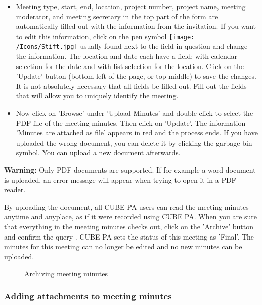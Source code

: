 \begin{itemize}
\item
Meeting type, start, end, location, project number, project name, meeting moderator, and meeting secretary in the top part of the form are automatically filled out with the information from the invitation. If you want to edit this information, click on the pen symbol \texttt{[image: /Icons/Stift.jpg]}  usually found next to the field in question and change the information. The location and date  each have a field: with calendar selection for the date and with list selection for the location. Click on the 'Update' button  (bottom left of the page, or top middle) to save the changes. It is not absolutely necessary that all fields be filled out. Fill out the fields that will allow you to uniquely identify the meeting.
\item
Now click on 'Browse'  under 'Upload Minutes' and double-click to select the PDF file of the meeting minutes. Then click on 'Update'. The information 'Minutes are attached as file' appears in red  and the process ends. If you have uploaded the wrong document, you can delete it by clicking the garbage bin symbol. You can upload a new document afterwards.
\end{itemize}

\vspace{\baselineskip}

\textbf{Warning:} Only PDF documents are supported. If for example a word document is uploaded, an error message will appear when trying to open it in a PDF reader.

\vspace{\baselineskip}

By uploading the document, all CUBE PA users can read the meeting minutes anytime and anyplace, as if it were recorded using CUBE PA. When you are sure that everything in the meeting minutes checks out, click on the 'Archive' button  and confirm the query . CUBE PA sets the status of this meeting as 'Final'. The minutes for this meeting can no longer be edited and no new minutes can be uploaded.

\begin{figure}[H]
\caption{Archiving meeting minutes}
\end{figure}

\subsubsection{Adding attachments to meeting minutes}

